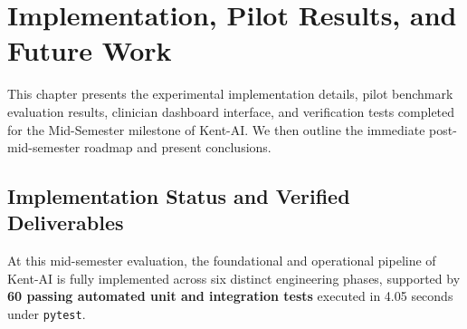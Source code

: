 \chapter{Implementation, Pilot Results, and Future Work}
\label{Chapter4}

\begin{sloppypar}
This chapter presents the experimental implementation details, pilot benchmark evaluation results, clinician dashboard interface, and verification tests completed for the Mid-Semester milestone of Kent-AI. We then outline the immediate post-mid-semester roadmap and present conclusions.

\section{Implementation Status and Verified Deliverables}
At this mid-semester evaluation, the foundational and operational pipeline of Kent-AI is fully implemented across six distinct engineering phases, supported by \textbf{60 passing automated unit and integration tests} executed in 4.05 seconds under \texttt{pytest}.

\begin{table}[htp]
\centering
\caption{Mid-semester engineering deliverables and verification status.}
\label{tab:implementation_status}
\end{table}


\end{sloppypar}
